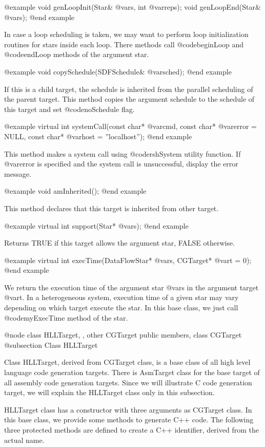@example
void genLoopInit(Star& @var{s}, int @var{reps});
void genLoopEnd(Star& @var{s});
@end example

In case a loop scheduling is taken, we may want to perform loop
initialization routines for stars inside each loop. There methods
call @code{beginLoop} and @code{endLoop} methods of the argument
star.

@example
void copySchedule(SDFSchedule& @var{sched});
@end example

If this is a child target, the schedule is inherited from the parallel
scheduling of the parent target. This method copies the argument
schedule to the schedule of this target and set @code{noSchedule} flag.

@example
virtual int systemCall(const char* @var{cmd}, const char* @var{error} = NULL, const char* @var{host} = ''localhost'');
@end example

This method makes a system call using @code{rshSystem} utility function.
If @var{error} is specified and the system call is unsuccessful, display the
error message.

@example
void amInherited();
@end example

This method declares that this target is inherited from other target.

@example
virtual int support(Star* @var{s});
@end example

Returns TRUE if this target allows the argument star, FALSE otherwise.

@example
virtual int execTime(DataFlowStar* @var{s}, CGTarget* @var{t} = 0);
@end example

We return the execution time of the argument star @var{s} in the argument
target @var{t}. In a heterogeneous system, execution time of a given
star may vary depending on which target execute the star. In this base
class, we just call @code{myExecTime} method of the star.

@node class HLLTarget, , other CGTarget public members, class CGTarget
@subsection Class HLLTarget

Class HLLTarget, derived from CGTarget class, is a base class of
all high level language code generation targets. There is
AsmTarget class for the base target of all assembly code generation
targets. Since we will illustrate C code generation target, we will
explain the HLLTarget class only in this subsection.

HLLTarget class has a constructor with three arguments as CGTarget class.
In this base class, we provide some methods to generate C++ code.
The following three protected methods are defined to create a
C++ identifier, derived from the actual name.

